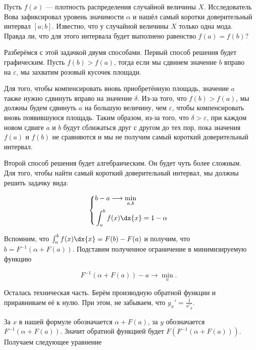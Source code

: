 \begin{problem}\label{upr_conf}
Пусть $f(x)$ --- плотность распределения случайной величины $X$. Исследователь Вова зафиксировал уровень значимости $\alpha$ и нашёл самый коротки доверительный интервал $[a;b]$. Известно, что у случайной величины $X$ только одна мода. Правда ли, что для этого интервала будет выполнено равенство $f(a) = f(b)$? 
\begin{sol}
Разберёмся с этой задачкой двумя способами. Первый способ решения будет графическим. Пусть $f(b) > f(a)$, тогда если мы сдвинем значение $b$ вправо на $\varepsilon$, мы захватим розовый кусочек площади. 


Для того, чтобы компенсировать вновь приобретённую площадь, значение $a$ также нужно сдвинуть вправо на значение $\delta$. Из-за того, что $f(b) > f(a)$, мы должны будем сдвинуть $a$ на большую величину, чем $\varepsilon$, чтобы компенсировать вновь появившуюся площадь. Таким образом, из-за того, что $\delta > \varepsilon$, при каждом новом сдвиге $a$ и $b$ будут сближаться друг с другом до тех пор, пока значения $f(a)$ и $f(b)$ не сравняются и мы не получим самый короткий доверительный интервал. 


Второй способ решения будет алгебраическим. Он будет чуть более сложным. Для того, чтобы найти самый короткий доверительный интервал, мы должны решить задачку вида: 

\begin{equation*}
\left \{
\begin{aligned}
&b - a \longrightarrow \min_{a,b}  \\
&\int_a^b f(x) \dx{x} = 1 - \alpha \\
\end{aligned}
\right.
\end{equation*}

Вспомним, что $\int_a^b f(x) \dx{x} = F(b) - F(a)$ и получим, что $b = F^{-1}(\alpha + F(a))$. Подставим полученное ограничение в минимизируемую функцию

\[ F^{-1}(\alpha + F(a)) - a \to \min_a.\]

Осталась техническая часть. Берём производную обратной функции и приравниваем её к нулю. При этом, не забываем, что $y_x' = \frac{1}{x'_y}$.

За $x$ в нашей формуле обозначается $\alpha + F(a)$, за $y$ обозначается $F^{-1}(\alpha + F(a))$. Значит обратной функцией будет $F(F^{-1}(\alpha + F(a)))$. Получаем следующее уравнение


\end{sol}
\end{problem}
